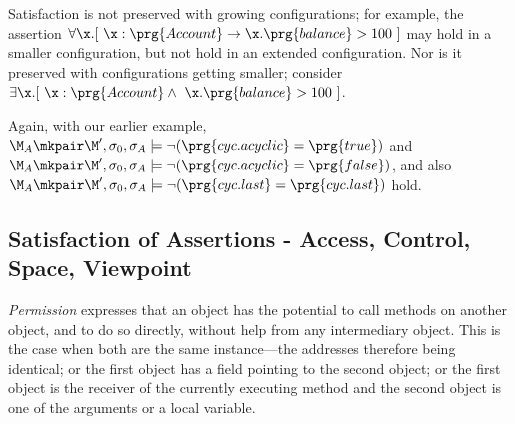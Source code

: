 Satisfaction is not preserved with growing configurations; for example, the assertion $\forall \x. [\ \x : \prg{Account} \rightarrow \x.\prg{balance}>100\ ]$ 
may hold in a smaller configuration, but not hold in an extended configuration. 
Nor is it preserved with configurations getting smaller; consider \eg $\exists \x. [\ \x : \prg{Account} \wedge\ \x.\prg{balance}>100\ ]$.

\noindent
Again, with our earlier example,  
$\M_A\mkpair \M', \sigma_0 , \sigma_A \models \neg (\prg{cyc.acyclic}=\prg{true})$    and  
$\M_A\mkpair \M', \sigma_0 , \sigma_A \models  \neg (\prg{cyc.acyclic}=\prg{false})$, 
and also 
$\M_A\mkpair \M', \sigma_0 , \sigma_A \models  \neg (\prg{cyc.last}=\prg{cyc.last})$
hold.

\subsection{Satisfaction of Assertions - Access, Control, Space, Viewpoint}
\label{sect:pcsv} 

\textit{Permission} expresses that an object has the potential to call
methods on another object, and to do so directly, without  help from any
intermediary object. This is the case when both are the same instance---the addresses therefore being identical; or the first object has a field pointing to the second object; or
the first object is the receiver of the currently executing method and the second object is one of the 
arguments or a local variable. 


